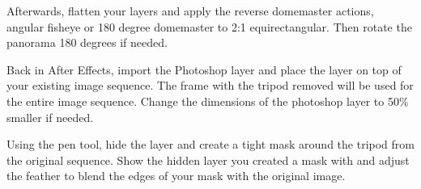 \begin{fullwidth}
Afterwards, flatten your layers and apply the reverse domemaster actions, angular fisheye or 180 degree domemaster to 2:1 equirectangular. Then rotate the panorama 180 degrees if needed. 

Back in After Effects, import the Photoshop layer and place the layer on top of your existing image sequence. The frame with the tripod removed will be used for the entire image sequence. Change the dimensions of the photoshop layer to 50\% smaller if needed.


Using the pen tool, hide the layer and create a tight mask around the tripod from the original sequence. Show the hidden layer you created a mask with and adjust the feather to blend the edges of your mask with the original image.

\clearpage
\end{fullwidth}